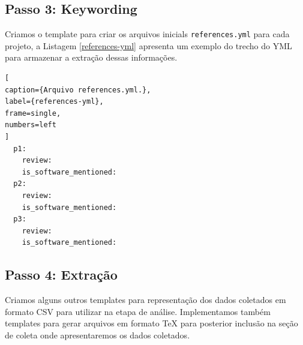 
%

\subsection{Passo 3: Keywording}


Criamos o template para criar os arquivos inicials \texttt{references.yml}
para cada projeto, a Listagem \ref{references-yml} apresenta um exemplo do
trecho do YML para armazenar a extração dessas informações.

\begin{lstlisting}[
caption={Arquivo references.yml.},
label={references-yml},
frame=single,
numbers=left
]
  p1:
    review:
    is_software_mentioned:
  p2:
    review:
    is_software_mentioned:
  p3:
    review:
    is_software_mentioned:
\end{lstlisting}

\subsection{Passo 4: Extração}


Criamos alguns outros templates para representação dos dados coletados em formato CSV
para utilizar na etapa de análise. Implementamos também templates para gerar arquivos em
formato TeX para posterior inclusão na seção de coleta onde apresentaremos os dados
coletados.


